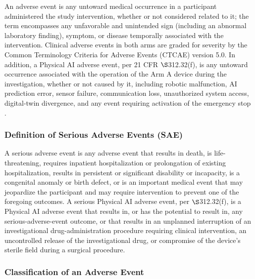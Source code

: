 An adverse event is any untoward medical occurrence in a participant administered the
study intervention, whether or not considered related to it; the term encompasses
any unfavorable and unintended sign (including an abnormal laboratory finding),
symptom, or disease temporally associated with the intervention. Clinical adverse
events in both arms are graded for severity by the Common Terminology Criteria for
Adverse Events (CTCAE) version 5.0. In addition, a Physical AI adverse event, per 21
CFR $\S$312.32(f), is any untoward occurrence associated with the operation of the
Arm A device during the investigation, whether or not caused by it, including robotic
malfunction, AI prediction error, sensor failure, communication loss, unauthorized
system access, digital-twin divergence, and any event requiring activation of the
emergency stop \cite{kawchak2026adapt312}.

\subsubsection{Definition of Serious Adverse Events (SAE)}

A serious adverse event is any adverse event that results in death, is
life-threatening, requires inpatient hospitalization or prolongation of existing
hospitalization, results in persistent or significant disability or incapacity, is a
congenital anomaly or birth defect, or is an important medical event that may
jeopardize the participant and may require intervention to prevent one of the
foregoing outcomes. A serious Physical AI adverse event, per $\S$312.32(f), is a
Physical AI adverse event that results in, or has the potential to result in, any
serious-adverse-event outcome, or that results in an unplanned interruption of an
investigational drug-administration procedure requiring clinical intervention, an
uncontrolled release of the investigational drug, or compromise of the device's
sterile field during a surgical procedure.


\subsubsection{Classification of an Adverse Event}

